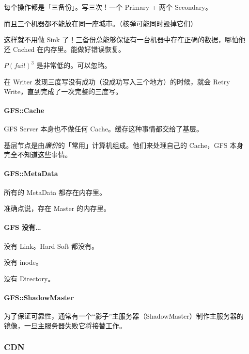 \documentclass[
]{article}
\begin{document}
每个操作都是「三备份」。写三次！一个 Primary + 两个 Secondary。

而且三个机器都不能放在同一座城市。（核弹可能同时毁掉它们）

这样就不用做 Sink
了！三备份总能够保证有一台机器中存在正确的数据，哪怕他还 Cached
在内存里。能做好错误恢复。

\(P(fail)^3\) 是非常低的。可以忽略。

在 Writer 发现三度写没有成功（没成功写入三个地方）的时候，就会 Retry
Write，直到完成了一次完整的三度写。

\hypertarget{header-n205}{%
\paragraph{GFS::Cache}\label{header-n205}}

GFS Server 本身也不做任何 Cache。缓存这种事情都交给了基层。

基层节点是由\emph{廉价}的「常用」计算机组成。他们来处理自己的 Cache，GFS
本身完全不知道这些事情。

\hypertarget{header-n208}{%
\paragraph{GFS::MetaData}\label{header-n208}}

所有的 MetaData 都存在内存里。

准确点说，存在 Master 的内存里。

\hypertarget{header-n211}{%
\paragraph{GFS 没有\ldots{}}\label{header-n211}}

没有 Link。Hard Soft 都没有。

没有 inode。

没有 Directory。

\hypertarget{header-n215}{%
\paragraph{GFS::ShadowMaster}\label{header-n215}}

为了保证可靠性，通常有一个``影子''主服务器（ShadowMaster）制作主服务器的镜像，一旦主服务器失败它将接替工作。

\hypertarget{header-n217}{%
\subsubsection{CDN}\label{header-n217}}
\end{document}
